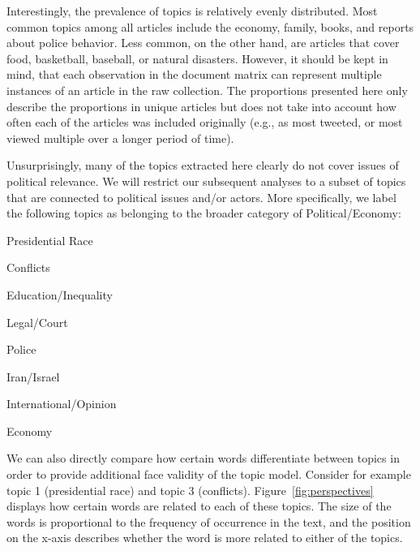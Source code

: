 \documentclass[12pt]{article}
\begin{document}
\begin{doublespace}
Interestingly, the prevalence of topics is relatively evenly distributed. Most common topics among all articles include the economy, family, books, and reports about police behavior. Less common, on the other hand, are articles that cover food, basketball, baseball, or natural disasters. However, it should be kept in mind, that each observation in the document matrix can represent multiple instances of an article in the raw collection. The proportions presented here only describe the proportions in unique articles but does not take into account how often each of the articles was included originally (e.g., as most tweeted, or most viewed multiple over a longer period of time).

Unsurprisingly, many of the topics extracted here clearly do not cover issues of political relevance. We will restrict our subsequent analyses to a subset of topics that are connected to political issues and/or actors. More specifically, we label the following topics as belonging to the broader category of Political/Economy:

\begin{enumerate}[(a)]\singlespacing
\begin{multicols}{2}
\item Presidential Race \item Conflicts \item Education/Inequality \item Legal/Court
\columnbreak
\item Police \item Iran/Israel \item International/Opinion \item Economy
\end{multicols}
\end{enumerate}

We can also directly compare how certain words differentiate between topics in order to provide additional face validity of the topic model. Consider for example topic 1 (presidential race) and topic 3 (conflicts). Figure~\ref{fig:perspectives} displays how certain words are related to each of these topics. The size of the words is proportional to the frequency of occurrence in the text, and the position on the x-axis describes whether the word is more related to either of the topics.


\end{doublespace}
\end{document}
